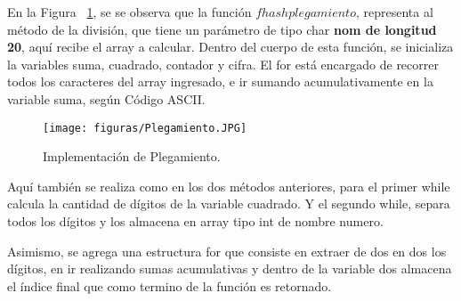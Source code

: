 \documentclass[10pt,conference]{IEEEtran}
\begin{document}
\begin{enumerate}[]
\begin{itemize}
        En la Figura ~\ref{plega}, se se observa que la función $fhash plegamiento$, representa al método de la división, que tiene un parámetro de tipo char \textbf{nom de longitud 20}, aquí recibe el array a calcular.
        Dentro del cuerpo de esta función, se inicializa la variables suma, cuadrado, contador y cifra. El for está encargado de recorrer todos los caracteres del array ingresado, e ir sumando acumulativamente en la variable suma, según Código ASCII.
        
        \begin{figure}[H]
        \begin{center}
            \texttt{[image: figuras/Plegamiento.JPG]}
            \caption{Implementación de Plegamiento.}
            \label{plega} 
        \end{center}
        \end{figure}

        Aquí también se realiza como en los dos métodos anteriores, para el primer while calcula la cantidad de dígitos de la variable cuadrado. Y el segundo while, separa todos los dígitos y los almacena en array tipo int de nombre numero.
        
        Asimismo, se agrega una estructura for que consiste en extraer de dos en dos los dígitos, en ir realizando sumas acumulativas y dentro de la variable dos almacena el índice final que como termino de la función es retornado.
        
    \end{itemize}
\end{enumerate}

\end{document}
